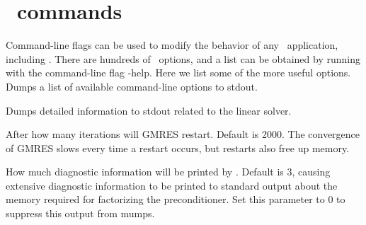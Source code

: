 \section{\PETSc~commands}

Command-line flags can be used to modify the behavior of any \PETSc~application, including \sfincs.
There are hundreds of \PETSc~options, and a list can be obtained by running with the command-line flag
{\ttfamily -help}. Here we list some of the more useful options.\\

{Dumps a list of available command-line options to stdout.}

\myhrule

{Dumps detailed information to stdout related to the linear solver.}

\myhrule

{After how many iterations will GMRES restart. Default is 2000. The convergence of GMRES slows every time a restart occurs, but restarts also free up memory.}

\myhrule

{How much diagnostic information will be printed by \mumps. Default is 3, causing extensive diagnostic information to be printed 
to standard output about the memory required for factorizing the preconditioner.
Set this parameter to 0 to suppress this output from mumps.}


